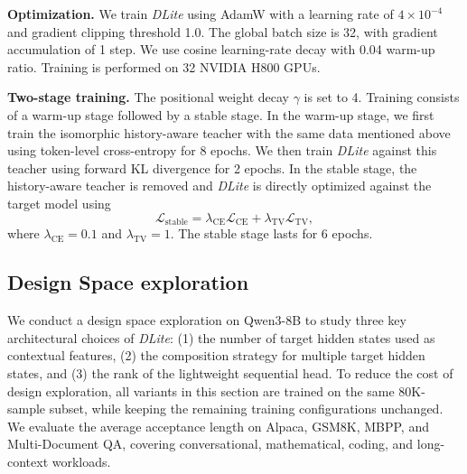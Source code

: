 \documentclass{article} %
\newcommand{\we}{\emph{DLite}\xspace}
\begin{document}
\textbf{Optimization.} We train \we using AdamW with a learning rate of $4 \times 10^{-4}$ and gradient clipping threshold 1.0. The global batch size is 32, with gradient accumulation of 1 step. We use cosine learning-rate decay with 0.04 warm-up ratio. Training is performed on 32 NVIDIA H800 GPUs.

\textbf{Two-stage training.} The positional weight decay $\gamma$ is set to 4. Training consists of a warm-up stage followed by a stable stage. In the warm-up stage, we first train the isomorphic history-aware teacher with the same data mentioned above using token-level cross-entropy for 8 epochs. We then train \we against this teacher using forward KL divergence for 2 epochs. In the stable stage, the history-aware teacher is removed and \we is directly optimized against the target model using
\[
\mathcal{L}_{\mathrm{stable}}
=
\lambda_{\mathrm{CE}}\mathcal{L}_{\mathrm{CE}}
+
\lambda_{\mathrm{TV}}\mathcal{L}_{\mathrm{TV}},
\]
where \(\lambda_{\mathrm{CE}}=0.1\) and \(\lambda_{\mathrm{TV}}=1\). The stable stage lasts for 6 epochs.



\subsection{Design Space exploration} \label{app:dse}
We conduct a design space exploration on Qwen3-8B to study three key architectural choices of \we: (1) the number of target hidden states used as contextual features, (2) the composition strategy for multiple target hidden states, and (3) the rank of the lightweight sequential head. To reduce the cost of design exploration, all variants in this section are trained on the same 80K-sample subset, while keeping the remaining training configurations unchanged. We evaluate the average acceptance length on Alpaca, GSM8K, MBPP, and Multi-Document QA, covering conversational, mathematical, coding, and long-context workloads.
\end{document}

